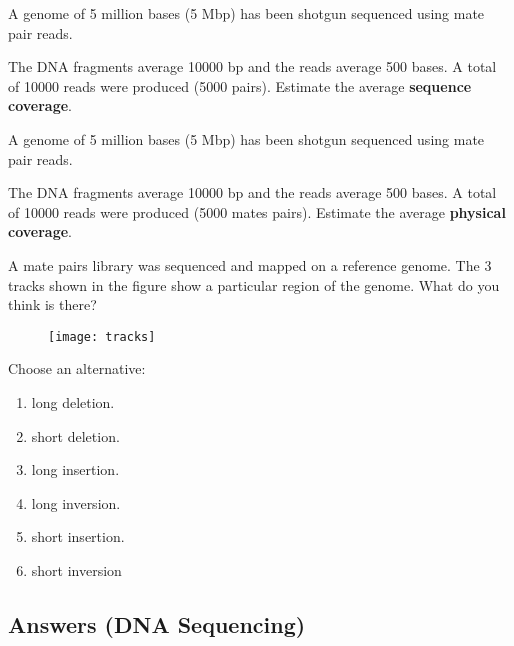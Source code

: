 \begin{Exercise} [
  title={Sequence coverage},
  difficulty={1},
  label={ex17},
  origin={G. Valle}
 ]

  \Question A genome of 5 million bases (5 Mbp) has been shotgun sequenced
using mate pair reads.

The DNA fragments average 10000 bp and the reads average 500 bases.
A total of 10000 reads were produced (5000 pairs). Estimate the average
\textbf{sequence coverage}.

\end{Exercise}

\begin{Exercise} [
  title={Physical coverage},
  difficulty={1},
  label={ex18},
  origin={G. Valle}
 ]

  \Question A genome of 5 million bases (5 Mbp) has been shotgun sequenced
using mate pair reads.

The DNA fragments average 10000 bp and the reads average 500 bases.
A total of 10000 reads were produced (5000 mates pairs). Estimate the average
\textbf{physical coverage}.

\end{Exercise}

\begin{Exercise} [
  title={Mate pairs},
  difficulty={1},
  label={ex19},
  origin={G. Valle}
 ]

A mate pairs library was sequenced and mapped on a reference genome.
The 3 tracks shown in the figure show a particular region of the genome.
What do you think is there?

 \begin{figure}[H]
  \centering
  \texttt{[image: tracks]}
 \end{figure}

Choose an alternative:

\begin{enumerate}
  \item long deletion.
  \item short deletion.
  \item long insertion.
  \item long inversion.
  \item short insertion.
  \item short inversion
\end{enumerate}

\end{Exercise}

\subsection{Answers (DNA Sequencing)}

